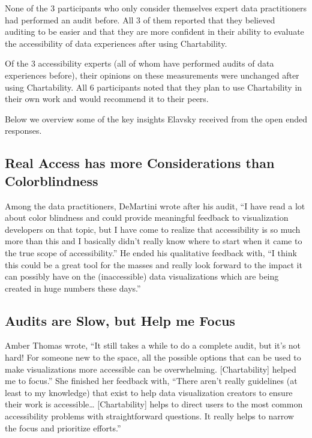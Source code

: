 \documentclass{egpubl}
\begin{document}
None of the 3 participants who only consider themselves expert data practitioners had performed an audit before. All 3 of them reported that they believed auditing to be easier and that they are more confident in their ability to evaluate the accessibility of data experiences after using Chartability. 

Of the 3 accessibility experts (all of whom have performed audits of data experiences before), their opinions on these measurements were unchanged after using Chartability. All 6 participants noted that they plan to use Chartability in their own work and would recommend it to their peers. 

Below we overview some of the key insights Elavsky received from the open ended responses.

\subsection{Real Access has more Considerations than Colorblindness}
Among the data practitioners, DeMartini wrote after his audit, ``I have read a lot about color blindness and could provide meaningful feedback to visualization developers on that topic, but I have come to realize that accessibility is so much more than this and I basically didn’t really know where to start when it came to the true scope of accessibility.'' He ended his qualitative feedback with, ``I think this could be a great tool for the masses and really look forward to the impact it can possibly have on the (inaccessible) data visualizations which are being created in huge numbers these days.''

\subsection{Audits are Slow, but Help me Focus}
Amber Thomas wrote, ``It still takes a while to do a complete audit, but it's not hard! For someone new to the space, all the possible options that can be used to make visualizations more accessible can be overwhelming. [Chartability] helped me to focus.'' She finished her feedback with, ``There aren't really guidelines (at least to my knowledge) that exist to help data visualization creators to ensure their work is accessible… [Chartability] helps to direct users to the most common accessibility problems with straightforward questions. It really helps to narrow the focus and prioritize efforts.'' 
\end{document}
